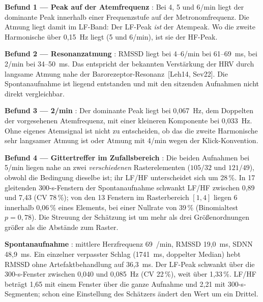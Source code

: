 
\textbf{Befund 1 --- Peak auf der Atemfrequenz} \KM: Bei 4, 5 und 6/min
liegt der dominante Peak innerhalb einer Frequenzstufe auf der
Metronomfrequenz. Die Atmung liegt damit im LF-Band: Der LF-Peak
\emph{ist} der Atempeak. Wo die zweite Harmonische über 0{,}15~Hz liegt
(5 und 6/min), ist sie der HF-Peak.

\textbf{Befund 2 --- Resonanzatmung} \KM: RMSSD liegt bei 4--6/min bei
61--69~ms, bei 2/min bei 34--50~ms. Das entspricht der bekannten
Verstärkung der HRV durch langsame Atmung nahe der Barorezeptor-Resonanz
\LM\,[Leh14, Sev22]. Die Spontanaufnahme ist liegend
entstanden und mit den sitzenden Aufnahmen nicht direkt vergleichbar.

\textbf{Befund 3 --- 2/min} \SM: Der dominante Peak liegt bei 0{,}067~Hz,
dem Doppelten der vorgesehenen Atemfrequenz, mit einer kleineren
Komponente bei 0{,}033~Hz. Ohne eigenes Atemsignal ist nicht zu
entscheiden, ob das die zweite Harmonische sehr langsamer Atmung ist oder
Atmung mit 4/min wegen der Klick-Konvention.

\textbf{Befund 4 --- Gittertreffer im Zufallsbereich} \KM: Die beiden
Aufnahmen bei 5/min liegen nahe an zwei \emph{verschiedenen}
Rasterelementen ($105/32$ und $121/49$), obwohl die Bedingung dieselbe
ist; ihr LF/HF unterscheidet sich um 28\,\%. In 17 gleitenden
300-s-Fenstern der Spontanaufnahme schwankt LF/HF zwischen 0{,}89 und
7{,}43 (CV 78\,\%); von den 13 Fenstern im Rasterbereich $[1,4]$ liegen 6
innerhalb 0{,}06\,\% eines Elements, bei einer Nullrate von 39\,\%
(Binomialtest $p=0{,}78$). Die Streuung der Schätzung ist um mehr als drei
Größenordnungen größer als die Abstände zum Raster.

\textbf{Spontanaufnahme} \KM: mittlere Herzfrequenz 69~/min, RMSSD
19{,}0~ms, SDNN 48{,}9~ms. Ein einzelner verpasster Schlag (1741~ms,
doppelter Median) hebt RMSSD ohne Artefaktbehandlung auf 36{,}3~ms. Der
LF-Peak schwankt über die 300-s-Fenster zwischen 0{,}040 und 0{,}085~Hz
(CV 22\,\%), weit über 1{,}33\,\%. LF/HF beträgt 1{,}65 mit einem Fenster
über die ganze Aufnahme und 2{,}21 mit 300-s-Segmenten; schon eine
Einstellung des Schätzers ändert den Wert um ein Drittel.


